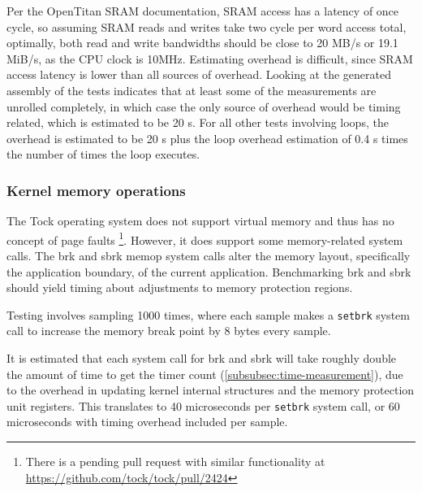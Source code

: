 \documentclass{article}
\begin{document}
Per the OpenTitan SRAM documentation, SRAM access has a latency of once cycle\cite{opentitan-latency}, so assuming SRAM reads and writes take two cycle per word access total, optimally, both read and write bandwidths should be close to 20 MB/s or 19.1 MiB/s, as the CPU clock is 10MHz. Estimating overhead is difficult, since SRAM access latency is lower than all sources of overhead. Looking at the generated assembly of the tests indicates that at least some of the measurements are unrolled completely, in which case the only source of overhead would be timing related, which is estimated to be 20 \textmu s. For all other tests involving loops, the overhead is estimated to be 20 \textmu s plus the loop overhead estimation of 0.4 \textmu s times the number of times the loop executes.


\subsubsection{Kernel memory operations}
The Tock operating system does not support virtual memory and thus has no concept of page faults \footnote{There is a pending pull request with similar functionality at \url{https://github.com/tock/tock/pull/2424}}. However, it does support some memory-related system calls. The brk and sbrk memop system calls alter the memory layout, specifically the application boundary, of the current application. Benchmarking brk and sbrk should yield timing about adjustments to memory protection regions.

Testing involves sampling 1000 times, where each sample makes a \texttt{setbrk} system call to increase the memory break point by 8 bytes every sample.

It is estimated that each system call for brk and sbrk will take roughly double the amount of time to get the timer count (\ref{subsubsec:time-measurement}), due to the overhead in updating kernel internal structures and the memory protection unit registers. This translates to 40 microseconds per \texttt{setbrk} system call, or 60 microseconds with timing overhead included per sample.
\end{document}
